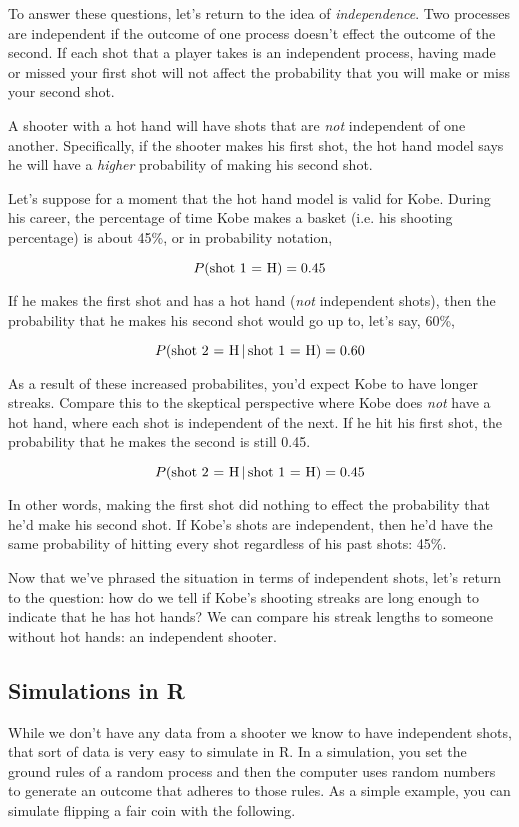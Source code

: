 \documentclass{article}\usepackage[]{graphicx}\usepackage[]{color}
\begin{document}
To answer these questions, let's return to the idea of \emph{independence}. Two processes are independent if the outcome of one process doesn't effect the outcome of the second. If each shot that a player takes is an independent process, having made or missed your first shot will not affect the probability that you will make or miss your second shot.

A shooter with a hot hand will have shots that are \emph{not} independent of one another. Specifically, if the shooter makes his first shot, the hot hand model says he will have a \emph{higher} probability of making his second shot.

Let's suppose for a moment that the hot hand model is valid for Kobe. During his career, the percentage of time Kobe makes a basket (i.e. his shooting percentage) is about 45\%, or in probability notation,

\[ P(\textnormal{shot 1 = H}) = 0.45 \]

If he makes the first shot and has a hot hand (\emph{not} independent shots), then the probability that he makes his second shot would go up to, let's say, 60\%,

\[ P\textnormal{(shot 2 = H} \, | \, \textnormal{shot 1 = H}) = 0.60 \]

As a result of these increased probabilites, you'd expect Kobe to have longer streaks. Compare this to the skeptical perspective where Kobe does \emph{not} have a hot hand, where each shot is independent of the next. If he hit his first shot, the probability that he makes the second is still 0.45.

\[ P(\textnormal{shot 2 = H} \, | \, \textnormal{shot 1 = H}) = 0.45 \]

In other words, making the first shot did nothing to effect the probability that he'd make his second shot. If Kobe's shots are independent, then he'd have the same probability of hitting every shot regardless of his past shots: 45\%.

Now that we've phrased the situation in terms of independent shots, let's return to the question: how do we tell if Kobe's shooting streaks are long enough to indicate that he has hot hands? We can compare his streak lengths to someone without hot hands: an independent shooter. 

%

\subsection*{Simulations in R}
While we don't have any data from a shooter we know to have independent shots, that sort of data is very easy to simulate in R. In a simulation, you set the ground rules of a random process and then the computer uses random numbers to generate an outcome that adheres to those rules. As a simple example, you can simulate flipping a fair coin with the following.
\end{document}
